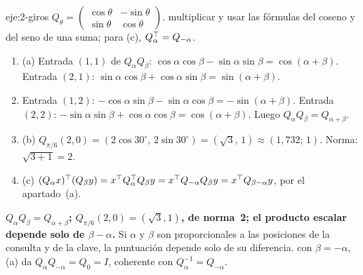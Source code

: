 \begin{solucion}{eje:2-giros}
\datos $Q_\theta=\begin{pmatrix}\cos\theta&-\sin\theta\\ \sin\theta&\cos\theta\end{pmatrix}$.
\planteamiento multiplicar y usar las fórmulas del coseno y del seno de una suma; para (c), $Q_\alpha^{\top}=Q_{-\alpha}$.
\pasos
\begin{enumerate}[label=\arabic*.]
  \item (a) Entrada $(1,1)$ de $Q_\alpha Q_\beta$: $\cos\alpha\cos\beta-\sin\alpha\sin\beta=\cos(\alpha+\beta)$. Entrada $(2,1)$: $\sin\alpha\cos\beta+\cos\alpha\sin\beta=\sin(\alpha+\beta)$.
  \item Entrada $(1,2)$: $-\cos\alpha\sin\beta-\sin\alpha\cos\beta=-\sin(\alpha+\beta)$. Entrada $(2,2)$: $-\sin\alpha\sin\beta+\cos\alpha\cos\beta=\cos(\alpha+\beta)$. Luego $Q_\alpha Q_\beta=Q_{\alpha+\beta}$.
  \item (b) $Q_{\pi/6}(2,0)=(2\cos 30^{\circ},\,2\sin 30^{\circ})=(\sqrt{3},\,1)\approx(1{,}732;\,1)$. Norma: $\sqrt{3+1}=2$.
  \item (c) $(Q_\alpha x)^{\top}(Q_\beta y)=x^{\top} Q_\alpha^{\top} Q_\beta y=x^{\top} Q_{-\alpha}Q_\beta y=x^{\top} Q_{\beta-\alpha}y$, por el apartado~(a).
\end{enumerate}
\resultado \textbf{$Q_\alpha Q_\beta=Q_{\alpha+\beta}$; $Q_{\pi/6}(2,0)=(\sqrt{3},1)$, de norma~2; el producto escalar depende solo de $\beta-\alpha$.} Si $\alpha$ y $\beta$ son proporcionales a las posiciones de la consulta y de la clave, la puntuación depende solo de su diferencia.
\comprobacion con $\beta=-\alpha$, (a) da $Q_\alpha Q_{-\alpha}=Q_0=I$, coherente con $Q_\alpha^{-1}=Q_{-\alpha}$.
\end{solucion}

